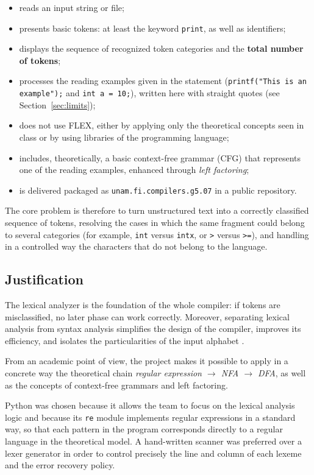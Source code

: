 \documentclass[11pt,letterpaper]{article}
\newcommand{\tok}[1]{\texttt{#1}}
\begin{document}
\begin{itemize}[nosep]
  \item reads an input string or file;
  \item presents basic tokens: at least the keyword \tok{print}, as well
        as identifiers;
  \item displays the sequence of recognized token categories and the
        \textbf{total number of tokens};
  \item processes the reading examples given in the statement
        (\tok{printf("This is an example");} and \tok{int a = 10;}),
        written here with straight quotes (see Section~\ref{sec:limits});
  \item does not use FLEX, either by applying only the theoretical concepts
        seen in class or by using libraries of the programming language;
  \item includes, theoretically, a basic context-free grammar (CFG) that
        represents one of the reading examples, enhanced through
        \emph{left factoring};
  \item is delivered packaged as \tok{unam.fi.compilers.g5.07} in a public
        repository.
\end{itemize}

The core problem is therefore to turn unstructured text into a correctly
classified sequence of tokens, resolving the cases in which the same fragment
could belong to several categories (for example, \tok{int} versus \tok{intx},
or \tok{>} versus \tok{>=}), and handling in a controlled way the characters
that do not belong to the language.

\subsection{Justification}

The lexical analyzer is the foundation of the whole compiler: if tokens are
misclassified, no later phase can work correctly. Moreover, separating
lexical analysis from syntax analysis simplifies the design of the compiler,
improves its efficiency, and isolates the particularities of the input
alphabet \cite{aho2006}.

From an academic point of view, the project makes it possible to apply in a
concrete way the theoretical chain \emph{regular expression $\rightarrow$ NFA
$\rightarrow$ DFA}, as well as the concepts of context-free grammars and left
factoring.

Python was chosen because it allows the team to focus on the
lexical analysis logic and because its \tok{re} module \cite{pythonre}
implements regular expressions in a standard way, so that each pattern in the
program corresponds directly to a regular language in the theoretical model.
A hand-written scanner was preferred over a lexer generator in order to
control precisely the line and column of each lexeme and the error recovery
policy.
\end{document}
